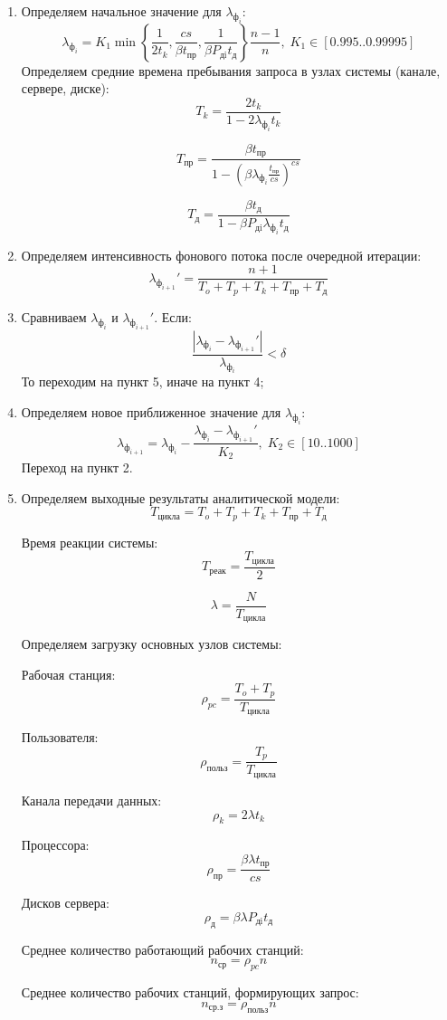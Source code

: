 \documentclass[russian,utf8,emptystyle]{eskdtext}
\begin{document}
\begin{enumerate}[label=\arabic*)]
\item Определяем начальное значение для $\lambda_{\text{ф}_i}$:
$$
\lambda_{\text{ф}_i} = K_1 \min \left\{ \frac{1}{2t_k}, \frac{c s}{\beta t_\text{пр}}, \frac{1}{\beta P_\text{дi} t_\text{д}} \right\} \frac{n - 1}{n}, \; K_1 \in [0.995 .. 0.99995]
$$
Определяем средние времена пребывания запроса в узлах системы (канале, сервере, диске):
$$
T_k = \frac{2t_k}{1 - 2\lambda_{\text{ф}_i}t_k}
$$

$$
T_\text{пр} = \frac{\beta t_\text{пр}}{1 - (\beta \lambda_{\text{ф}_i} \frac{t_\text{пр}}{cs} )^{cs}}
$$

$$
T_\text{д} = \frac{\beta t_\text{д} }{1 - \beta P_\text{дi} \lambda_{\text{ф}_i} t_\text{д}}
$$

\item Определяем интенсивность фонового потока после очередной итерации:
$$
\lambda_{\text{ф}_{i+1}}' = \frac{n+1}{T_o + T_p + T_k + T_\text{пр} + T_\text{д}}
$$

\item Сравниваем $\lambda_{\text{ф}_i}$ и $\lambda_{\text{ф}_{i+1}}'$. Если:
$$
    \frac{| \lambda_{\text{ф}_i} - \lambda_{\text{ф}_{i+1}}' |}{\lambda_{\text{ф}_i}} < \delta
$$
То переходим на пункт 5, иначе на пункт 4;

\item Определяем новое приближенное значение для $\lambda_{\text{ф}_i}$:
$$
\lambda_{\text{ф}_{i+1}} = \lambda_{\text{ф}_i} - \frac{\lambda_{\text{ф}_i} - \lambda_{\text{ф}_{i+1}}'}{K_2}, \; K_2 \in [10 .. 1000]
$$
Переход на пункт 2.

\item Определяем выходные результаты аналитической модели:
$$
T_\text{цикла} = T_o + T_p + T_k + T_\text{пр} + T_\text{д}
$$

Время реакции системы:
$$
T_\text{реак} = \frac{T_\text{цикла}}{2}
$$

$$
\lambda = \frac{N}{T_\text{цикла}}
$$

Определяем загрузку основных узлов системы:

Рабочая станция:
$$
    \rho_{pc} = \frac{T_o + T_p}{T_\text{цикла}}
$$

Пользователя:
$$
    \rho_\text{польз} = \frac{T_p}{T_\text{цикла}}
$$

Канала передачи данных:
$$
    \rho_k = 2 \lambda t_k
$$


Процессора:
$$
	\rho_\text{пр} = \frac{\beta \lambda t_\text{пр}}{cs}
$$

Дисков сервера:
$$
	\rho_\text{д} = \beta \lambda P_\text{дi} t_\text{д}
$$

Среднее количество работающий рабочих станций:
$$
	n_\text{ср} = \rho_{pc} n
$$

Среднее количество рабочих станций, формирующих запрос:
$$
	n_\text{ср.з} = \rho_\text{польз} n
$$
\end{enumerate}
\end{document}
